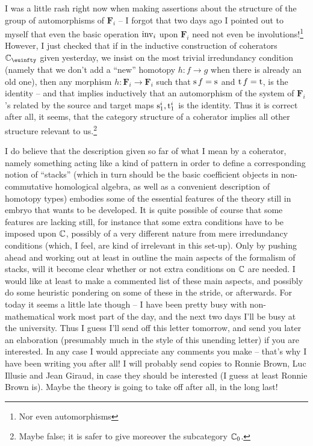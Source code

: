 I was a little rash right now when making assertions about the
structure of the group of automorphisms of $\boldsymbol F_i$ -- I forgot that
two days ago I pointed out to myself that even the basic operation
$\operatorname{inv}_i$ upon $\boldsymbol F_i$ need not even be involutions!\footnote{Nor
  even automorphisms} However, I just checked that if in the inductive
construction of coherators $\bC_\oo$ given yesterday, we insist on
the most trivial irredundancy condition (namely that we don't add a
``new'' homotopy $h: f\to g$ when there is already an old one), then
any morphism $h: \boldsymbol F_i \to \boldsymbol F_i$ such that $\mathrm{s}\,f=\mathrm{s}$
and $\mathrm{t}\,f=\mathrm{t}$, is the identity -- and that
implies inductively that an automorphism of the system of $\boldsymbol F_i$'s
related by the source and target maps $\mathrm{s}_1^i,\mathrm{t}_1^i$ is the
identity. Thus it is correct after all, it seems, that the category
structure of a coherator implies all other structure relevant to
us.\footnote{Maybe false; it is safer to give moreover the subcategory
  ${\mathbb{C}}_0$.}

I do believe that the description given so far of what I mean by a
coherator, namely something acting like a kind of pattern in order to
define a corresponding notion of ``stacks'' (which in turn should be
the basic coefficient objects in non-commutative homological algebra,
as well as a convenient description of homotopy types) embodies some
of the essential features of the theory still in embryo that wants to
be developed. It is quite possible of course that some features are
lacking still, for instance that some extra conditions have to be
imposed upon ${\mathbb{C}}$, possibly of a very different nature from mere
irredundancy conditions (which, I feel, are kind of irrelevant in this
set-up). Only by pushing ahead and working out at least in outline the
main aspects of the formalism of stacks, will it become clear whether
or not extra conditions on ${\mathbb{C}}$ are needed. I would like at least
to make a commented list of these main aspects, and possibly do some
heuristic pondering on some of these in the stride, or afterwards. For
today it seems a little late though -- I have been pretty busy with
non-mathematical work most part of the day, and the next two days I'll
be busy at the university. Thus I guess I'll send off this letter
tomorrow, and send you later an elaboration (presumably much in the
style of this unending letter) if you are interested. In any case I
would appreciate any comments you make -- that's why I have been
writing you after all! I will probably send copies to Ronnie Brown,
Luc Illusie and Jean Giraud, in case they should be interested (I
guess at least Ronnie Brown is). Maybe the theory is going to take off
after all, in the long last!

